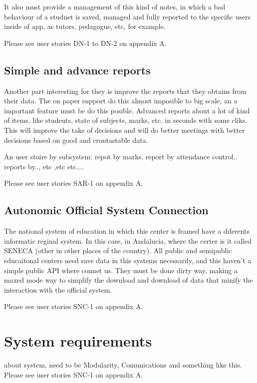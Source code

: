 It also must provide a management of this kind of notes, in which a bad behaviour of a studnet is saved, managed and fully reported to the specific users inside of app, as tutors, pedagogue, etc, for example.

Please see user stories DN-1 to DN-2 on appendix A.



\bigskip
\subsection{Simple and advance reports}
\bigskip

Another part interesting for they is improve the reports that they obtains from their data. The on paper support do this almost imposible to big scale, an a important feature must be do this posible. Advanced reports about a lot of kind of items, like students, state of subjects, marks, etc, in seconds with some cliks.
This will improve the take of decisions and will do better meetings with better decisions based on good and crontastable data.


An user stoire by subsystem: repot by marks, report by attendance control..
reports by.., etc ,etc etc....

Please see user stories SAR-1 on appendix A.




\bigskip
\subsection{Autonomic Official System Connection}
\bigskip

The national system of education in which this center is framed have a diferents informatic reginal system. In this case, in Andalucia, where the certer is it called SENECA (other in other places of the country). All public and semipublic educaitonal centers need save data in this systems necessarily, and this haven't a simple public API where connet us. They must be done dirty way, making a maxed mode way to simplify the download and download of data that minify the interaction with the official system.


Please see user stories SNC-1 on appendix A.

\section{System requirements}

about system, need to be Modularity, Comunications and something like this. 
Please see user stories SNC-1 on appendix A.
